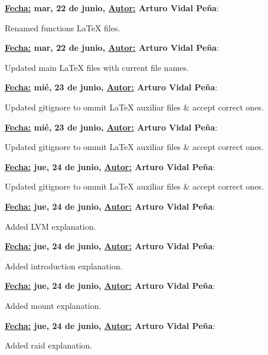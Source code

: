 \item \textbf{\underline{Fecha:} mar, 22 de junio, \underline{Autor:} Arturo Vidal Peña}:\\\item[] Renamed functions LaTeX files.\\
\item \textbf{\underline{Fecha:} mar, 22 de junio, \underline{Autor:} Arturo Vidal Peña}:\\\item[] Updated main LaTeX files with current file names.\\
\item \textbf{\underline{Fecha:} mié, 23 de junio, \underline{Autor:} Arturo Vidal Peña}:\\\item[] Updated gitignore to ommit LaTeX auxiliar files \& accept correct ones.\\
\item \textbf{\underline{Fecha:} mié, 23 de junio, \underline{Autor:} Arturo Vidal Peña}:\\\item[] Updated gitignore to ommit LaTeX auxiliar files \& accept correct ones.\\
\item \textbf{\underline{Fecha:} jue, 24 de junio, \underline{Autor:} Arturo Vidal Peña}:\\\item[] Updated gitignore to ommit LaTeX auxiliar files \& accept correct ones.\\
\item \textbf{\underline{Fecha:} jue, 24 de junio, \underline{Autor:} Arturo Vidal Peña}:\\\item[] Added LVM explanation.\\
\item \textbf{\underline{Fecha:} jue, 24 de junio, \underline{Autor:} Arturo Vidal Peña}:\\\item[] Added introduction explanation.\\
\item \textbf{\underline{Fecha:} jue, 24 de junio, \underline{Autor:} Arturo Vidal Peña}:\\\item[] Added mount explanation.\\
\item \textbf{\underline{Fecha:} jue, 24 de junio, \underline{Autor:} Arturo Vidal Peña}:\\\item[] Added raid explanation.\\
